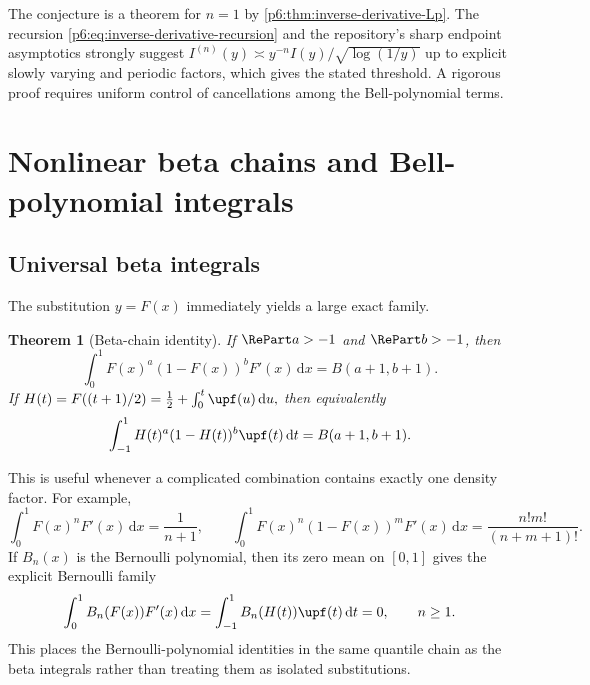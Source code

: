 \documentclass[11pt,oneside]{article}
\newtheorem{theorem}{Theorem}[section]
\theoremstyle{definition}
\theoremstyle{remark}
\newcommand{\dd}{\,\mathrm d}
\newcommand{\1}{\mathbf 1}
\begin{document}
The conjecture is a theorem for \(n=1\) by \cref{p6:thm:inverse-derivative-Lp}.  The
recursion \eqref{p6:eq:inverse-derivative-recursion} and the repository's sharp endpoint
asymptotics strongly suggest
\(
 I^{(n)}(y)\asymp y^{-n}I(y)/\sqrt{\log(1/y)}
\)
up to explicit slowly varying and periodic factors, which gives the stated threshold.
A rigorous proof requires uniform control of cancellations among the Bell-polynomial
terms.

\section{Nonlinear beta chains and Bell-polynomial integrals}

\subsection{Universal beta integrals}

The substitution \(y=F(x)\) immediately yields a large exact family.

\begin{theorem}[Beta-chain identity]
\label{p6:thm:beta-chain}
If \(\RePart a>-1\) and \(\RePart b>-1\), then
\begin{equation}
 \boxed{
 \int_0^1F(x)^a(1-F(x))^bF'(x)\dd x
 =B(a+1,b+1).
 }                                                        \label{p6:eq:beta-chain}
\end{equation}
If
\(
 H(t)=F((t+1)/2)=\frac12+\int_0^t\upf(u)\dd u,
\)
then equivalently
\begin{equation}
 \int_{-1}^1H(t)^a(1-H(t))^b\upf(t)\dd t=B(a+1,b+1).     \label{p6:eq:beta-chain-up}
\end{equation}
\end{theorem}

This is useful whenever a complicated combination contains exactly one density factor.
For example,
\begin{equation}
 \int_0^1F(x)^nF'(x)\dd x=\frac1{n+1},\qquad
 \int_0^1F(x)^n(1-F(x))^mF'(x)\dd x
 =\frac{n!m!}{(n+m+1)!}.                                  \label{p6:eq:beta-integers}
\end{equation}
If \(B_n(x)\) is the Bernoulli polynomial, then its zero mean on \([0,1]\) gives the
explicit Bernoulli family
\begin{equation}
 \int_0^1B_n(F(x))F'(x)\dd x
 =\int_{-1}^1B_n(H(t))\upf(t)\dd t=0,
 \qquad n\ge1.                                            \label{p6:eq:Bernoulli-chain}
\end{equation}
This places the Bernoulli-polynomial identities in the same quantile chain as the beta
integrals rather than treating them as isolated substitutions.
\end{document}
